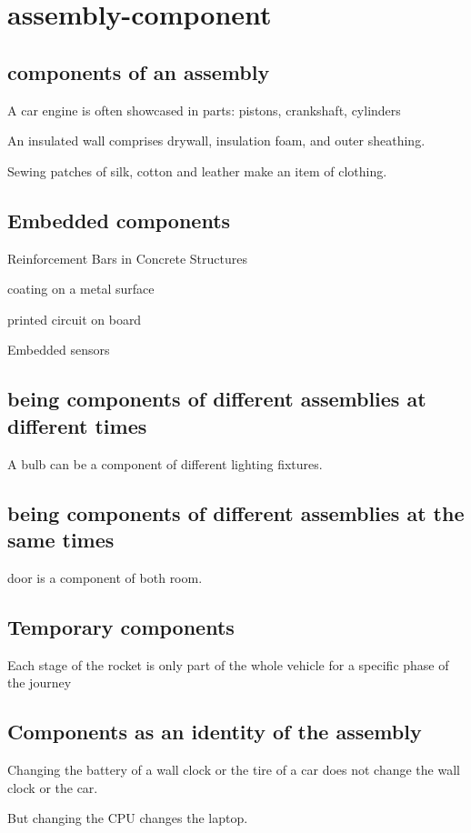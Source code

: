 \chapter{assembly-component}

\section{components of an assembly}

A car engine is often showcased in parts: pistons, crankshaft, cylinders

An insulated wall comprises drywall, insulation foam, and outer sheathing.

Sewing patches of silk, cotton and leather make an item of clothing.

\section{Embedded components}

Reinforcement Bars in Concrete Structures

coating on a metal surface

printed circuit on board

Embedded sensors

\section{being components of different assemblies at different times}

A bulb can be a component of different lighting fixtures.

\section{being components of different assemblies at the same times}

door is a component of both room.

\section{Temporary components}

Each stage of the rocket is only part of the whole vehicle for a specific phase of the journey

\section {Components as an identity of the assembly}

Changing the battery of a wall clock or the tire of a car does not change the wall clock or the car.

But changing the CPU changes the laptop. 








